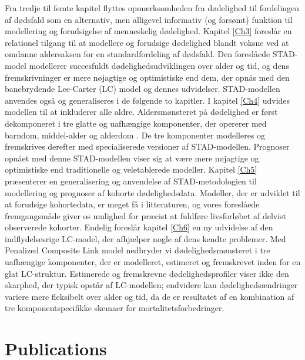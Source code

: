 \documentclass[Thesis]{subfiles}
\begin{document}
Fra tredje til femte kapitel flyttes opm{\ae}rksomheden fra d{\o}delighed til fordelingen af d{\o}dsfald som en alternativ, men alligevel informativ (og fors{\o}mt) funktion til modellering og forudsigelse af menneskelig d{\o}delighed. Kapitel \ref{Ch3} foresl{\aa}r en relationel tilgang til at modellere og forudsige d{\o}delighed blandt voksne ved at omdanne aldersaksen for en standardfordeling af d{\o}dsfald. Den foresl{\aa}ede STAD-model modellerer succesfuldt d{\o}delighedsudviklingen over alder og tid, og dens fremskrivninger er mere n{\o}jagtige og optimistiske end dem, der opn{\aa}s med den banebrydende Lee-Carter (LC) model \citep{lee1992modeling} og dennes udvidelser. STAD-modellen anvendes ogs{\aa} og generaliseres i de f{\o}lgende to kapitler. I kapitel \ref{Ch4} udvides modellen til at inkluderer alle aldre. Aldersm{\o}nsteret p{\aa} d{\o}delighed er f{\o}rst dekomponeret i tre glatte og uafh{\ae}ngige komponenter, der opererer med barndom, middel-alder og alderdom \cite[oprindeligt foresl{\aa}et af][]{thiele1871mathematical}. De tre komponenter modelleres og fremskrives derefter med specialiserede versioner af STAD-modellen. Prognoser opn{\aa}et med denne STAD-modellen viser sig at v{\ae}re mere n{\o}jagtige og optimistiske end traditionelle og veletablerede modeller. Kapitel \ref{Ch5} pr{\ae}senterer en generalisering og anvendelse af STAD-metodologien til modellering og prognoser af kohorte d{\o}delighedsdata. Modeller, der er udviklet til at forudsige kohortedata, er meget f{\aa} i litteraturen, og vores foresl{\aa}ede fremgangsm{\aa}de giver os mulighed for pr{\ae}cist at fuldf{\o}re livsforl{\o}bet af delvist observerede kohorter. Endelig foreslår kapitel \ref{Ch6} en ny udvidelse af den indflydelsesrige LC-model, der afhj{\ae}lper nogle af dens kendte problemer. Med Penalized Composite Link model nedbryder vi d{\o}delighedsm{\o}nsteret i tre uafh{\ae}ngige komponenter, der er modelleret, estimeret og fremskrevet inden for en glat LC-struktur. Estimerede og fremskrevne d{\o}delighedsprofiler viser ikke den skarphed, der typisk opstår af LC-modellen; endvidere kan d{\o}deligheds{\ae}ndringer variere mere fleksibelt over alder og tid, da de er resultatet af en kombination af tre komponentspecifikke skemaer for mortalitetsforbedringer.

\newpage

\chapter*{Publications}
\end{document}
